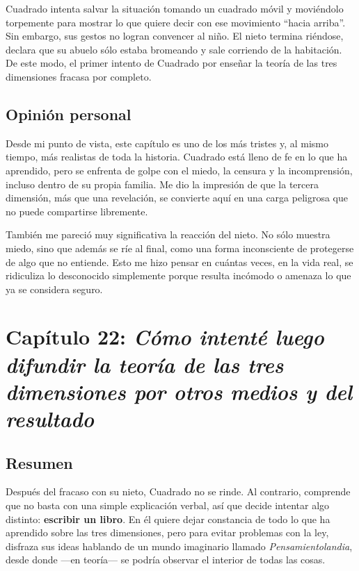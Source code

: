 \documentclass{article}
\begin{document}
Cuadrado intenta salvar la situación tomando un cuadrado móvil y moviéndolo torpemente para mostrar lo que quiere decir con ese movimiento “hacia arriba”. Sin embargo, sus gestos no logran convencer al niño. El nieto termina riéndose, declara que su abuelo sólo estaba bromeando y sale corriendo de la habitación. De este modo, el primer intento de Cuadrado por enseñar la teoría de las tres dimensiones fracasa por completo.

\subsection*{Opinión personal}

Desde mi punto de vista, este capítulo es uno de los más tristes y, al mismo tiempo, más realistas de toda la historia. Cuadrado está lleno de fe en lo que ha aprendido, pero se enfrenta de golpe con el miedo, la censura y la incomprensión, incluso dentro de su propia familia. Me dio la impresión de que la tercera dimensión, más que una revelación, se convierte aquí en una carga peligrosa que no puede compartirse libremente.

También me pareció muy significativa la reacción del nieto. No sólo muestra miedo, sino que además se ríe al final, como una forma inconsciente de protegerse de algo que no entiende. Esto me hizo pensar en cuántas veces, en la vida real, se ridiculiza lo desconocido simplemente porque resulta incómodo o amenaza lo que ya se considera seguro.

\section*{\textcolor{Tamarillo}{Capítulo 22: \emph{Cómo intenté luego difundir la teoría de las tres dimensiones por otros medios y del resultado}}}

\subsection*{Resumen}

Después del fracaso con su nieto, Cuadrado no se rinde. Al contrario, comprende que no basta con una simple explicación verbal, así que decide intentar algo distinto: \textbf{escribir un libro}. En él quiere dejar constancia de todo lo que ha aprendido sobre las tres dimensiones, pero para evitar problemas con la ley, disfraza sus ideas hablando de un mundo imaginario llamado \emph{Pensamientolandia}, desde donde —en teoría— se podría observar el interior de todas las cosas.
\end{document}
